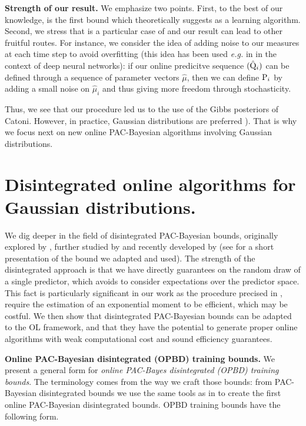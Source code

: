 \textbf{Strength of our result.} We emphasize two points. First, to the best of our knowledge,  is the first bound which theoretically suggests  as a learning algorithm.
Second, we stress that 
is a particular case of  and our result can lead to other fruitful routes. For instance, we consider the idea of adding noise to our measures at each time step to avoid overfitting (this idea has been used \emph{e.g.} in \citealp{neelakantan2015adding} in the context of deep neural networks): if our online predicitve sequence $(\hat{\Q}_i)$ can be defined through a sequence of parameter vectors $\hat{\mu}$, then we can define $\P_{i}$ by adding a small noise on $\hat{\mu}_i$ and thus giving more freedom through stochasticity.

Thus, we see that our procedure led us to the use of the Gibbs posteriors of Catoni. However, in practice, Gaussian distributions are preferred \citep[\emph{e.g.}][]{dziugaite2017computing, rivasplata2019pac,perez2021progress,perezortiz2021learning,perez2021tighter}).
That is why we focus next on new online PAC-Bayesian algorithms involving Gaussian distributions.


\section{Disintegrated online algorithms for Gaussian distributions.}
\label{sec: OPBD_procedure}
We dig deeper in the field of disintegrated PAC-Bayesian bounds, originally explored by \citet{catoni2007pac,blanchard2007occam}, further studied by \citet{alquier2013sparse,guedj2013pac} and recently developed by \citet{rivasplata2020pac,viallard2023general} (see  for a short presentation of the bound we adapted and used). The strength of the disintegrated approach is that we have directly guarantees on the random draw of a single predictor, which avoids to consider expectations over the predictor space.
This fact is particularly significant in our work as the procedure precised in , require the estimation of an exponential moment to be efficient, which may be costful.
We then show that disintegrated PAC-Bayesian bounds can be adapted to the OL framework, and that they have the potential to generate proper online algorithms with weak computational cost and sound efficiency guarantees.

\textbf{Online PAC-Bayesian disintegrated (OPBD) training bounds.} We present a general form for \emph{online PAC-Bayes disintegrated (OPBD) training bounds}. The terminology comes from the way we craft those bounds: from PAC-Bayesian disintegrated bounds we use the same tools as in  to create the first online PAC-Bayesian disintegrated bounds.
OPBD training bounds have the following form.

